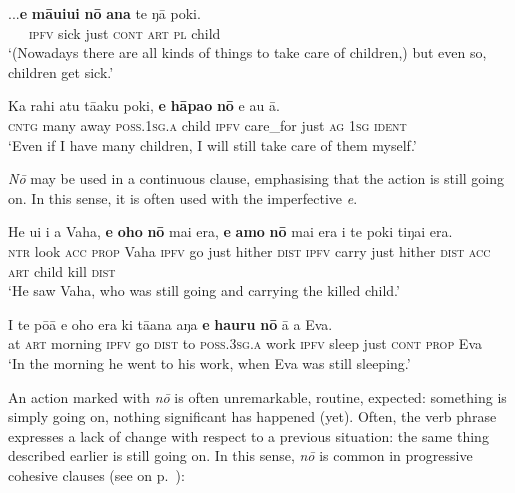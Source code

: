 \ea\label{ex:7.106}
\gll ...\textbf{e} \textbf{māuiui} \textbf{nō} \textbf{{\ꞌ}ana} te ŋā poki. \\
~~~\textsc{ipfv} sick just \textsc{cont} \textsc{art} \textsc{pl} child \\

\glt 
‘(Nowadays there are all kinds of things to take care of children,) but even so, children get sick.’ \textstyleExampleref{[R380.138]} 
\z

\ea\label{ex:7.107}
\gll Ka rahi atu tā{\ꞌ}aku poki, \textbf{e} \textbf{hāpa{\ꞌ}o} \textbf{nō} e au {\ꞌ}ā.\\
\textsc{cntg} many away \textsc{poss.1sg.a} child \textsc{ipfv} care\_for just \textsc{ag} \textsc{1sg} \textsc{ident}\\

\glt 
‘Even if I have many children, I will still take care of them myself.’ \textstyleExampleref{[R229.023]} 
\z

\textit{Nō} may be used in a continuous clause, emphasising that the action is still going on. In this sense, it is often used with the imperfective \textit{e}. 

\ea\label{ex:7.108}
\gll He u{\ꞌ}i i a Vaha, \textbf{e} \textbf{oho} \textbf{nō} mai era, \textbf{e} \textbf{{\ꞌ}amo} \textbf{nō} mai era i te poki tiŋa{\ꞌ}i era.\\
\textsc{ntr} look \textsc{acc} \textsc{prop} Vaha \textsc{ipfv} go just hither \textsc{dist} \textsc{ipfv} carry just hither \textsc{dist} \textsc{acc} \textsc{art} child kill \textsc{dist}\\

\glt 
‘He saw Vaha, who was still going and carrying the killed child.’ \textstyleExampleref{[Mtx-3-01.144]}
\z

\ea\label{ex:7.109}
\gll {\ꞌ}I te pō{\ꞌ}ā e oho era ki tā{\ꞌ}ana aŋa \textbf{e} \textbf{ha{\ꞌ}uru} \textbf{nō} {\ꞌ}ā a Eva. \\
at \textsc{art} morning \textsc{ipfv} go \textsc{dist} to \textsc{poss.3sg.a} work \textsc{ipfv} sleep just \textsc{cont} \textsc{prop} Eva \\

\glt
‘In the morning he went to his work, when Eva was still sleeping.’ \textstyleExampleref{[R210.025]} 
\z

An action marked with \textit{nō} is often unremarkable, routine, expected: something is simply going on, nothing significant has happened (yet). Often, the verb phrase expresses a lack of change with respect to a previous situation: the same thing described earlier is still going on. In this sense, \textit{nō} is common in progressive cohesive clauses (see  on p.~\pageref{ex:11.213}):

